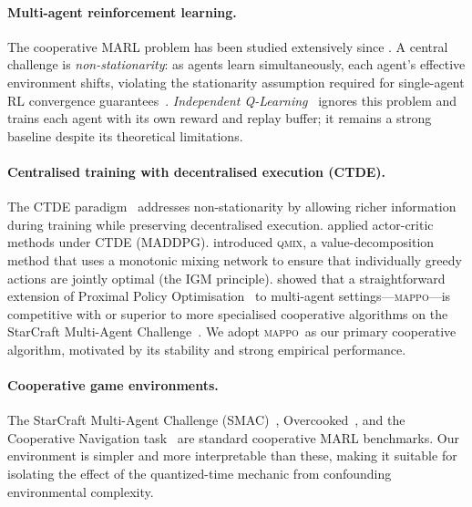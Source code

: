 \documentclass[12pt]{article}
\newcommand{\MAPPO}{\textsc{mappo}}
\newcommand{\QMIX}{\textsc{qmix}}
\begin{document}
\paragraph{Multi-agent reinforcement learning.}
The cooperative MARL problem has been studied extensively since
\citet{busoniu2008comprehensive}.  A central challenge is
\emph{non-stationarity}: as agents learn simultaneously, each agent's
effective environment shifts, violating the stationarity assumption required
for single-agent RL convergence guarantees~\citep{hernandez2017survey}.
\emph{Independent Q-Learning}~\citep{tan1993multi} ignores this problem and
trains each agent with its own reward and replay buffer; it remains a strong
baseline despite its theoretical limitations.

\paragraph{Centralised training with decentralised execution (CTDE).}
The CTDE paradigm~\citep{oliehoek2016concise} addresses non-stationarity by
allowing richer information during training while preserving decentralised
execution.  \citet{lowe2017multi} applied actor-critic methods under CTDE
(MADDPG).  \citet{rashid2018qmix} introduced \QMIX, a value-decomposition
method that uses a monotonic mixing network to ensure that individually greedy
actions are jointly optimal (the IGM principle).
\citet{yu2022surprising} showed that a straightforward extension of
Proximal Policy Optimisation~\citep{schulman2017proximal} to multi-agent
settings—\MAPPO—is competitive with or superior to more specialised
cooperative algorithms on the StarCraft Multi-Agent
Challenge~\citep{samvelyan2019starcraft}.  We adopt \MAPPO\ as our primary
cooperative algorithm, motivated by its stability and strong empirical
performance.

\paragraph{Cooperative game environments.}
The StarCraft Multi-Agent Challenge (SMAC)~\citep{samvelyan2019starcraft},
Overcooked~\citep{carroll2019utility}, and the Cooperative
Navigation task~\citep{lowe2017multi} are standard cooperative MARL
benchmarks.  Our environment is simpler and more interpretable than these,
making it suitable for isolating the effect of the quantized-time mechanic
from confounding environmental complexity.

\end{document}
